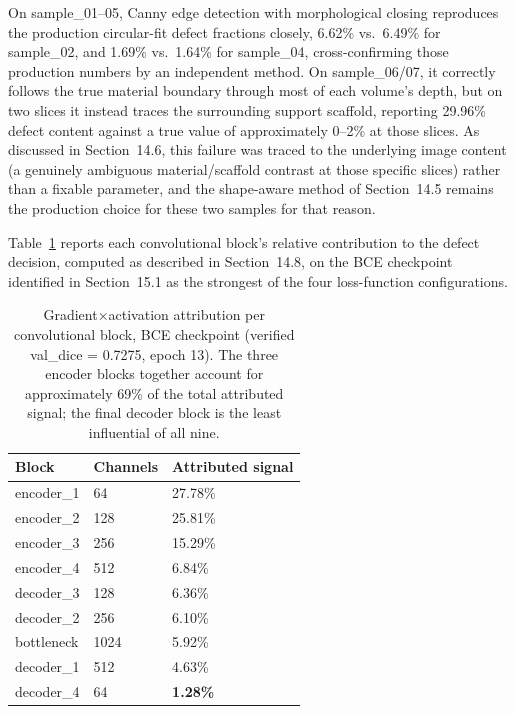 On sample\_01--05, Canny edge detection with morphological closing reproduces the production
circular-fit defect fractions closely, 6.62\% vs.\ 6.49\% for sample\_02, and 1.69\% vs.\ 1.64\% for
sample\_04, cross-confirming those production numbers by an independent method. On sample\_06/07, it
correctly follows the true material boundary through most of each volume's depth, but on two slices it
instead traces the surrounding support scaffold, reporting 29.96\% defect content against a true value
of approximately 0--2\% at those slices. As discussed in Section~14.6, this failure was traced to the
underlying image content (a genuinely ambiguous material/scaffold contrast at those specific slices)
rather than a fixable parameter, and the shape-aware method of Section~14.5 remains the production
choice for these two samples for that reason.

Table~\ref{tab:convblock} reports each convolutional block's relative contribution to the defect
decision, computed as described in Section~14.8, on the BCE checkpoint identified in Section~15.1 as
the strongest of the four loss-function configurations.

\begin{table}[htbp]
\centering
\caption{Gradient$\times$activation attribution per convolutional block, BCE checkpoint (verified
  val\_dice = 0.7275, epoch 13). The three encoder blocks together account for approximately 69\% of
  the total attributed signal; the final decoder block is the least influential of all nine.}
\label{tab:convblock}
\begin{tabular}{lll}
\toprule
\textbf{Block} & \textbf{Channels} & \textbf{Attributed signal} \\
\midrule
encoder\_1  & 64   & 27.78\% \\
encoder\_2  & 128  & 25.81\% \\
encoder\_3  & 256  & 15.29\% \\
encoder\_4  & 512  & 6.84\% \\
decoder\_3  & 128  & 6.36\% \\
decoder\_2  & 256  & 6.10\% \\
bottleneck  & 1024 & 5.92\% \\
decoder\_1  & 512  & 4.63\% \\
decoder\_4  & 64   & \textbf{1.28\%} \\
\bottomrule
\end{tabular}
\end{table}

